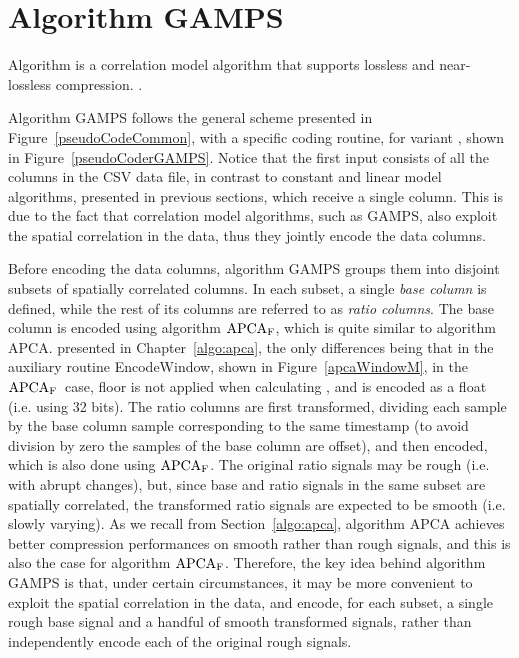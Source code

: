 
\section{Algorithm GAMPS}
\label{algo:gamps}
\newcommand{\apcaF}{$\textnormal{APCA}_\textnormal{F}$}


\vspace{-5pt}
Algorithm \textit{\GAMPSfull} \cite{coder:gamps} is a correlation model algorithm that supports lossless and near-lossless compression. \WindowParam {}.


Algorithm GAMPS follows the general scheme presented in Figure~\ref{pseudoCodeCommon}, with a specific coding routine, for variant \maskalgo, shown in Figure~\ref{pseudoCoderGAMPS}. Notice that the first input consists of all the columns in the CSV data file, in contrast to constant and linear model algorithms, presented in previous sections, which receive a single column. This is due to the fact that correlation model algorithms, such as GAMPS, also exploit the spatial correlation in the data, thus they jointly encode the data columns. 


Before encoding the data columns, algorithm GAMPS groups them into disjoint subsets of spatially correlated columns. In each subset, a single \textit{base column} is defined, while the rest of its columns are referred to as \textit{ratio columns}. The base column is encoded using algorithm \apcaF, which is quite similar to algorithm APCA. presented in Chapter~\ref{algo:apca}, the only differences being that in the auxiliary routine EncodeWindow, shown in Figure~\ref{apcaWindowM}, in the \apcaF\ case, floor is not applied when calculating \midrange, and \midrange is encoded as a float (i.e. using 32 bits). The ratio columns are first transformed, dividing each sample by the base column sample corresponding to the same timestamp (to avoid division by zero the samples of the base column are offset), and then encoded, which is also done using \apcaF. The original ratio signals may be rough (i.e. with abrupt changes), but, since base and ratio signals in the same subset are spatially correlated, the transformed ratio signals are expected to be smooth (i.e. slowly varying). As we recall from Section~\ref{algo:apca}, algorithm APCA achieves better compression performances on smooth rather than rough signals, and this is also the case for algorithm \apcaF. Therefore, the key idea behind algorithm GAMPS is that, under certain circumstances, it may be more convenient to exploit the spatial correlation in the data, and encode, for each subset, a single rough base signal and a handful of smooth transformed signals, rather than independently encode each of the original rough signals.


